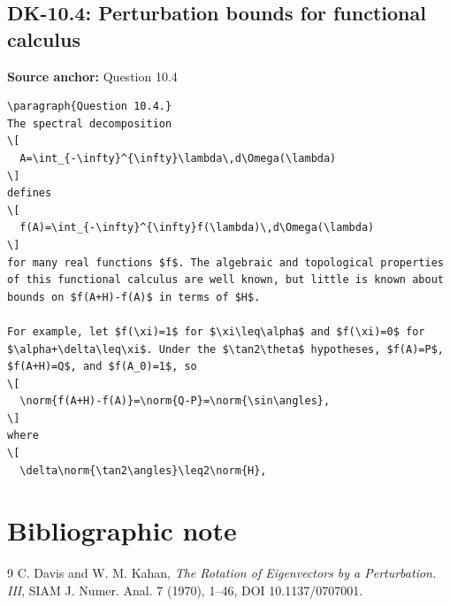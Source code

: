 \subsection*{DK-10.4: Perturbation bounds for functional calculus}
\noindent\textbf{Source anchor:} Question 10.4\\
\begin{verbatim}
\paragraph{Question 10.4.}
The spectral decomposition
\[
  A=\int_{-\infty}^{\infty}\lambda\,d\Omega(\lambda)
\]
defines
\[
  f(A)=\int_{-\infty}^{\infty}f(\lambda)\,d\Omega(\lambda)
\]
for many real functions $f$. The algebraic and topological properties of this functional calculus are well known, but little is known about bounds on $f(A+H)-f(A)$ in terms of $H$.

For example, let $f(\xi)=1$ for $\xi\leq\alpha$ and $f(\xi)=0$ for $\alpha+\delta\leq\xi$. Under the $\tan2\theta$ hypotheses, $f(A)=P$, $f(A+H)=Q$, and $f(A_0)=1$, so
\[
  \norm{f(A+H)-f(A)}=\norm{Q-P}=\norm{\sin\angles},
\]
where
\[
  \delta\norm{\tan2\angles}\leq2\norm{H},
\end{verbatim}

\section*{Bibliographic note}
\begin{thebibliography}{9}
C. Davis and W. M. Kahan,
\emph{The Rotation of Eigenvectors by a Perturbation. III},
SIAM J. Numer. Anal. 7 (1970), 1--46, DOI 10.1137/0707001.
\end{thebibliography}


